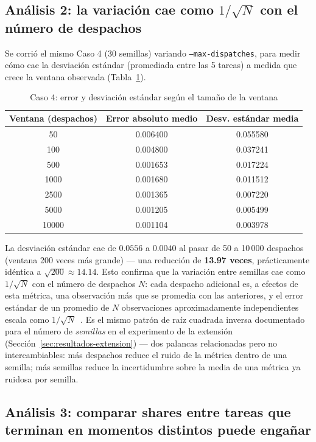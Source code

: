\subsection{Análisis 2: la variación cae como $1/\sqrt{N}$ con el número de despachos}

Se corrió el mismo Caso 4 (30 semillas) variando \texttt{--max-dispatches},
para medir cómo cae la desviación estándar (promediada entre las 5 tareas)
a medida que crece la ventana observada (Tabla~\ref{tab:ventana}).

\begin{table}[htbp]
\caption{Caso 4: error y desviación estándar según el tamaño de la ventana}
\label{tab:ventana}
\centering
\begin{tabular}{ccc}
\toprule
Ventana (despachos) & Error absoluto medio & Desv. estándar media \\
\midrule
50    & 0.006400 & 0.055580 \\
100   & 0.004800 & 0.037241 \\
500   & 0.001653 & 0.017224 \\
1000  & 0.001680 & 0.011512 \\
2500  & 0.001365 & 0.007220 \\
5000  & 0.001205 & 0.005499 \\
10000 & 0.001104 & 0.003978 \\
\bottomrule
\end{tabular}
\end{table}

La desviación estándar cae de $0.0556$ a $0.0040$ al pasar de 50 a 10\,000
despachos (ventana 200 veces más grande) --- una reducción de
\textbf{13.97 veces}, prácticamente idéntica a $\sqrt{200} \approx 14.14$.
Esto confirma que la variación entre semillas cae como $1/\sqrt{N}$ con el
número de despachos $N$: cada despacho adicional es, a efectos de esta
métrica, una observación más que se promedia con las anteriores, y el error
estándar de un promedio de $N$ observaciones aproximadamente independientes
escala como $1/\sqrt{N}$~\cite{NIST2003Handbook, NISTCSRCCLT}. Es el mismo
patrón de raíz cuadrada inversa
documentado para el número de \emph{semillas} en el experimento de la
extensión (Sección~\ref{sec:resultados-extension}) --- dos palancas
relacionadas pero no intercambiables: más despachos reduce el ruido de la
métrica dentro de una semilla; más semillas reduce la incertidumbre sobre
la media de una métrica ya ruidosa por semilla.

\subsection{Análisis 3: comparar shares entre tareas que terminan en momentos distintos puede engañar}

